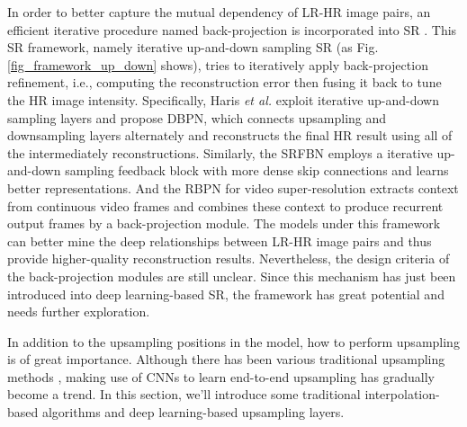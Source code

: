{\label{sec_framework_up_down}
In order to better capture the mutual dependency of LR-HR image pairs, an efficient iterative procedure named back-projection  is incorporated into SR .
This SR framework, namely iterative up-and-down sampling SR (as Fig. \ref{fig_framework_up_down} shows), tries to iteratively apply back-projection refinement, i.e., computing the reconstruction error then fusing it back to tune the HR image intensity.
Specifically, Haris \textit{et al.}  exploit iterative up-and-down sampling layers and propose DBPN, which connects upsampling and downsampling layers alternately and reconstructs the final HR result using all of the intermediately reconstructions.
Similarly, the SRFBN  employs a iterative up-and-down sampling feedback block with more dense skip connections and learns better representations.
And the RBPN  for video super-resolution extracts context from continuous video frames and combines these context to produce recurrent output frames by a back-projection module.
The models under this framework can better mine the deep relationships between LR-HR image pairs and thus provide higher-quality reconstruction results.
Nevertheless, the design criteria of the back-projection modules are still unclear.
Since this mechanism has just been introduced into deep learning-based SR, the framework has great potential and needs further exploration.

\label{sec_upsampling_methods}
In addition to the upsampling positions in the model, how to perform upsampling is of great importance.
Although there has been various traditional upsampling methods , making use of CNNs to learn end-to-end upsampling has gradually become a trend.  
In this section, we'll introduce some traditional interpolation-based algorithms and deep learning-based upsampling layers.

}

